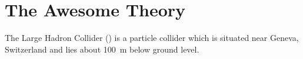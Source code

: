 

\chapter{The Awesome Theory}	\label{ch::theory}

The Large Hadron Collider () is a particle collider which is situated near Geneva, Switzerland and lies about 100~m below ground level. 